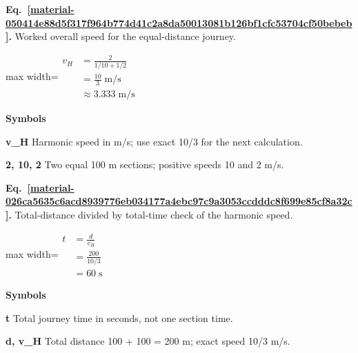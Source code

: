 \documentclass[11pt,a4paper]{article}
\begin{document}
\par\medskip
\begin{samepage}
\label{material-050414e88d5f317f964b774d41c2a8da50013081b126bf1cfc53704cf50bebeb}
\noindent\textbf{Eq.~\ref*{material-050414e88d5f317f964b774d41c2a8da50013081b126bf1cfc53704cf50bebeb}.} Worked overall speed for the equal-distance journey.\par\nopagebreak
\begin{center}\begin{adjustbox}{max width=\linewidth}$\displaystyle \begin{aligned}v_H&=\frac{2}{1/10+1/2}\\&=\frac{10}{3}\;\mathrm{m/s}\\&\approx3.333\;\mathrm{m/s}\end{aligned}$\end{adjustbox}\end{center}

\par\noindent\textbf{Symbols}

\par\noindent\textbf{v\_H} Harmonic speed in m/s; use exact 10/3 for the next calculation.

\par\noindent\textbf{2, 10, 2} Two equal 100 m sections; positive speeds 10 and 2 m/s.

\end{samepage}
\medskip

\par\medskip
\begin{samepage}
\label{material-026ca5635c6acd8939776eb034177a4ebc97c9a3053ccdddc8f699e85cf8a32c}
\noindent\textbf{Eq.~\ref*{material-026ca5635c6acd8939776eb034177a4ebc97c9a3053ccdddc8f699e85cf8a32c}.} Total-distance divided by total-time check of the harmonic speed.\par\nopagebreak
\begin{center}\begin{adjustbox}{max width=\linewidth}$\displaystyle \begin{aligned}t&=\frac{d}{v_H}\\&=\frac{200}{10/3}\\&=60\;\mathrm{s}\end{aligned}$\end{adjustbox}\end{center}

\par\noindent\textbf{Symbols}

\par\noindent\textbf{t} Total journey time in seconds, not one section time.

\par\noindent\textbf{d, v\_H} Total distance 100 + 100 = 200 m; exact speed 10/3 m/s.

\end{samepage}
\medskip
\end{document}
